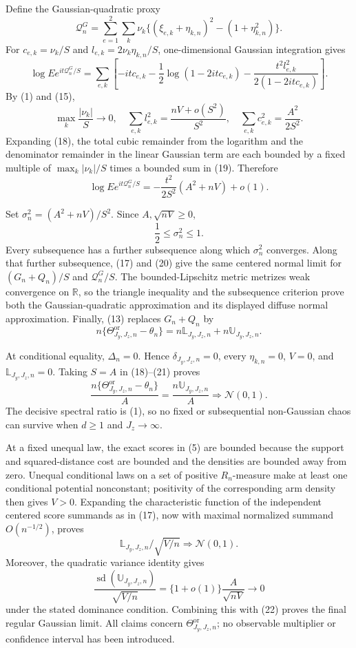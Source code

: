 Define the Gaussian-quadratic proxy
\[
\mathcal Q_n^G=\sum_{e=1}^2\sum_k\nu_k
\{(\xi_{e,k}+\eta_{k,n})^2-(1+\eta_{k,n}^2)\}.
\]
For \(c_{e,k}=\nu_k/S\) and \(l_{e,k}=2\nu_k\eta_{k,n}/S\), one-dimensional Gaussian integration gives
\[
\log Ee^{it\mathcal Q_n^G/S}
=\sum_{e,k}\left[-itc_{e,k}-\frac12\log(1-2itc_{e,k})
-\frac{t^2l_{e,k}^2}{2(1-2itc_{e,k})}\right]. \tag{18}
\]
By (1) and (15),
\[
\max_k\frac{|\nu_k|}{S}\to0,
\quad
\sum_{e,k}l_{e,k}^2=\frac{nV+o(S^2)}{S^2},
\quad
\sum_{e,k}c_{e,k}^2=\frac{A^2}{2S^2}. \tag{19}
\]
Expanding (18), the total cubic remainder from the logarithm and the denominator remainder in the linear Gaussian term are each bounded by a fixed multiple of \(\max_k|\nu_k|/S\) times a bounded sum in (19). Therefore
\[
\log Ee^{it\mathcal Q_n^G/S}
=-\frac{t^2}{2S^2}(A^2+nV)+o(1). \tag{20}
\]

Set \(\sigma_n^2=(A^2+nV)/S^2\). Since \(A,\sqrt{nV}\ge0\),
\[
\frac12\le\sigma_n^2\le1. \tag{21}
\]
Every subsequence has a further subsequence along which \(\sigma_n^2\) converges. Along that further subsequence, (17) and (20) give the same centered normal limit for \((G_n+Q_n)/S\) and \(\mathcal Q_n^G/S\). The bounded-Lipschitz metric metrizes weak convergence on \(\mathbb R\), so the triangle inequality and the subsequence criterion prove both the Gaussian-quadratic approximation and its displayed diffuse normal approximation. Finally, (13) replaces \(G_n+Q_n\) by
\[
n\{\Theta^{\mathrm{or}}_{J_y,J_z,n}-\theta_n\}
=n\mathbb L_{J_y,J_z,n}+n\mathbb U_{J_y,J_z,n}. \tag{22}
\]

At conditional equality, \(\Delta_n=0\). Hence \(\delta_{J_y,J_z,n}=0\), every \(\eta_{k,n}=0\), \(V=0\), and \(\mathbb L_{J_y,J_z,n}=0\). Taking \(S=A\) in (18)--(21) proves
\[
\frac{n\{\Theta^{\mathrm{or}}_{J_y,J_z,n}-\theta_n\}}{A}
=\frac{n\mathbb U_{J_y,J_z,n}}{A}\Rightarrow\mathcal N(0,1).
\]
The decisive spectral ratio is (1), so no fixed or subsequential non-Gaussian chaos can survive when \(d\ge1\) and \(J_z\to\infty\).

At a fixed unequal law, the exact scores in (5) are bounded because the support and squared-distance cost are bounded and the densities are bounded away from zero. Unequal conditional laws on a set of positive \(R_n\)-measure make at least one conditional potential nonconstant; positivity of the corresponding arm density then gives \(V>0\). Expanding the characteristic function of the independent centered score summands as in (17), now with maximal normalized summand \(O(n^{-1/2})\), proves
\[
\mathbb L_{J_y,J_z,n}/\sqrt{V/n}\Rightarrow\mathcal N(0,1).
\]
Moreover, the quadratic variance identity gives
\[
\frac{\operatorname{sd}(\mathbb U_{J_y,J_z,n})}{\sqrt{V/n}}
=\{1+o(1)\}\frac{A}{\sqrt{nV}}\longrightarrow0
\]
under the stated dominance condition. Combining this with (22) proves the final regular Gaussian limit. All claims concern \(\Theta^{\mathrm{or}}_{J_y,J_z,n}\); no observable multiplier or confidence interval has been introduced.